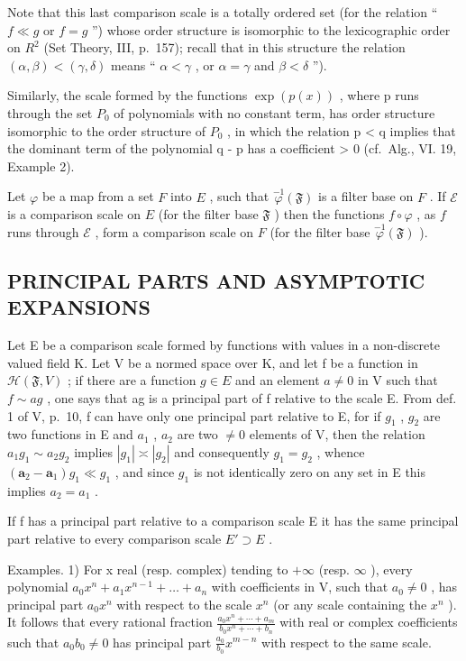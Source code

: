 Note that this last comparison scale is a totally ordered set (for the relation `` \(f \ll g\) or \(f = g\) '') whose order structure is isomorphic to the lexicographic order on \(R^{2}\) (Set Theory, III, p.~157); recall that in this structure the relation \((\alpha, \beta) < (\gamma, \delta)\) means `` \(\alpha < \gamma\) , or \(\alpha = \gamma\) and \(\beta < \delta\) '').

Similarly, the scale formed by the functions \(\exp(p(x))\) , where p runs through the set \(P_{0}\) of polynomials with no constant term, has order structure isomorphic to the order structure of \(P_{0}\) , in which the relation p \textless{} q implies that the dominant term of the polynomial q - p has a coefficient \textgreater{} 0 (cf.~Alg., VI. 19, Example 2).

Let \(\varphi\) be a map from a set \(F\) into \(E\) , such that \(\overset{-1}{\varphi}(\mathfrak{F})\) is a filter base on \(F\) . If \(\mathcal{E}\) is a comparison scale on \(E\) (for the filter base \(\mathfrak{F}\) ) then the functions \(f \circ \varphi\) , as \(f\) runs through \(\mathcal{E}\) , form a comparison scale on \(F\) (for the filter base \(\overset{-1}{\varphi}(\mathfrak{F})\) ).

\subsection{PRINCIPAL PARTS AND ASYMPTOTIC EXPANSIONS}

Let E be a comparison scale formed by functions with values in a non-discrete valued field K. Let V be a normed space over K, and let f be a function in \(\mathcal{H}(\mathfrak{F}, V)\) ; if there are a function \(g \in E\) and an element \(a \neq 0\) in V such that \(f \sim ag\) , one says that ag is a principal part of f relative to the scale E. From def. 1 of V, p.~10, f can have only one principal part relative to E, for if \(g_{1}\) , \(g_{2}\) are two functions in E and \(a_{1}\) , \(a_{2}\) are two \(\neq 0\) elements of V, then the relation \(a_{1}g_{1} \sim a_{2}g_{2}\) implies \(|g_{1}| \asymp |g_{2}|\) and consequently \(g_{1} = g_{2}\) , whence \((\mathbf{a}_{2} - \mathbf{a}_{1})g_{1} \ll g_{1}\) , and since \(g_{1}\) is not identically zero on any set in E this implies \(a_{2} = a_{1}\) .

If f has a principal part relative to a comparison scale E it has the same principal part relative to every comparison scale \(E' \supset E\) .

Examples. 1) For x real (resp. complex) tending to \(+\infty\) (resp. \(\infty\) ), every polynomial \(a_{0}x^{n} + a_{1}x^{n-1} + \ldots + a_{n}\) with coefficients in V, such that \(a_{0} \neq 0\) , has principal part \(a_{0}x^{n}\) with respect to the scale \(x^{n}\) (or any scale containing the \(x^{n}\) ). It follows that every rational fraction \(\frac{a_{0}x^{n} + \cdots + a_{m}}{b_{0}x^{n} + \cdots + b_{n}}\) with real or complex coefficients such that \(a_{0}b_{0} \neq 0\) has principal part \(\frac{a_{0}}{b_{0}}x^{m-n}\) with respect to the same scale.

